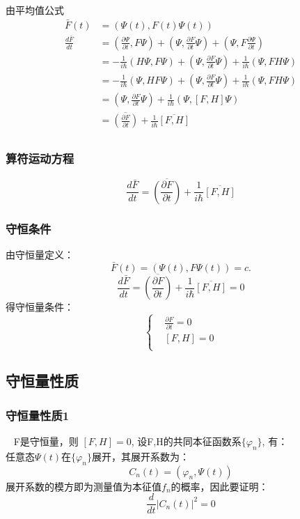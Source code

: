 \begin{frame}
    由平均值公式  
        \begin{equation*}
            \begin{split} 
            \bar{F}(t)&=(\Psi(t), F(t)\Psi(t)) \\
            \frac{d\bar{F}}{dt}&=(\frac{\partial\Psi }{\partial t}, F\Psi) +(\Psi, \frac{\partial F }{\partial t}\Psi) +(\Psi, F\frac{\partial\Psi }{\partial t}) \\
            &= - \frac{1}{i\hbar} (H\Psi, F\Psi)+(\Psi, \frac{\partial F }{\partial t}\Psi) + \frac{1}{i\hbar} (\Psi, FH\Psi) \\
            &= - \frac{1}{i\hbar} (\Psi, HF\Psi)+(\Psi, \frac{\partial F }{\partial t}\Psi) + \frac{1}{i\hbar} (\Psi, FH\Psi) \\
            &= (\Psi, \frac{\partial F }{\partial t}\Psi)  +\frac{1}{i\hbar} (\Psi, [F,H]\Psi) \\
            &=\overline{(\frac{\partial F }{\partial t})}  +\frac{1}{i\hbar} \overline{[F,H]} \\
            \end{split}  
        \end{equation*}
    \end{frame} 

\begin{frame}
    \frametitle{算符运动方程}  
        \[\boxed{\frac{d\bar{F}}{dt} = \overline{(\frac{\partial F }{\partial t})}  +\frac{1}{i\hbar} \overline{[F,H]}}\]
\end{frame} 

\begin{frame} 
        \frametitle{守恒条件} 
        由守恒量定义：   
        $$ \bar{F}(t)=(\Psi(t), F\Psi(t)) =c.  $$
        $$\frac{d\bar{F}}{dt}=\overline{(\frac{\partial F }{\partial t})}  +\frac{1}{i\hbar} \overline{[F,H]}=0$$
        得守恒量条件：
        $$\left\{\begin{aligned}
            &\frac{\partial F }{\partial t}=0\\
            &[F,H]=0 \\
        \end{aligned} \right. $$
\end{frame}

\subsection{守恒量性质}

\begin{frame} 
    \frametitle{守恒量性质1} 
    \例[1.试证明守恒量测量值的概率分布不随时间改变]{}
    \证~ F是守恒量，则 $[F,H]=0$, 设F,H的共同本征函数系$\{\varphi_n\}$, 有：\\ 
    任意态$\Psi(t)$在$\{\varphi_n\}$展开，其展开系数为：
    $$C_n(t)=(\varphi_n, \Psi(t))$$
    展开系数的模方即为测量值为本征值$f_n$的概率，因此要证明：
    $$\frac{d}{dt} |C_n(t)|^2=0$$
\end{frame}

